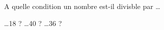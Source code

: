 %
%
A quelle condition un nombre est-il divisble par \dots
    \begin{tasks}
        \task \dots 18 ? \dotfill
        \task \dots 40 ? \dotfill
        \task \dots 36 ? \dotfill
    \end{tasks}
